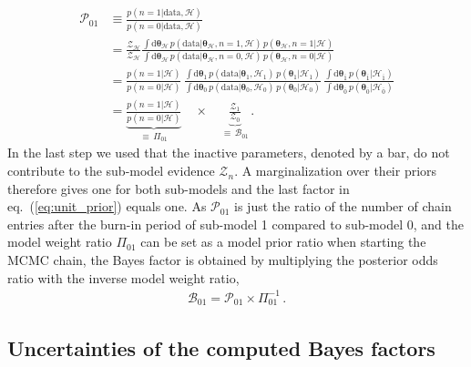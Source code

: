 	\begin{align}
		\mathcal{P}_{01} &\equiv \frac{p(n=1| \text{data}, \mathcal{H})}{p(n=0| \text{data}, \mathcal{H})} \nonumber  \\
		&= \frac{\mathcal{Z}_\mathcal{H}}{\mathcal{Z}_\mathcal{H}} \frac{\int \text{d}\bm{\theta}_\mathcal{H} \, p(\text{data} | \bm{\theta}_\mathcal{H}, n=1, \mathcal{H}) \, p(\bm{\theta}_\mathcal{H}, n=1 | \mathcal{H})}{\int \text{d}\bm{\theta}_\mathcal{H} \, p(\text{data} | \bm{\theta}_\mathcal{H}, n=0, \mathcal{H}) \, p(\bm{\theta}_\mathcal{H}, n=0 | \mathcal{H})} \nonumber  \\
		&= \frac{p(n=1 | \mathcal{H})}{p(n=0 | \mathcal{H})} \, \frac{\int \text{d}\bm{\theta}_1\, p(\text{data} | \bm{\theta}_1, \mathcal{H}_1) \, p(\bm{\theta}_1| \mathcal{H}_1)}{\int \text{d}\bm{\theta}_0 \, p(\text{data} | \bm{\theta}_0, \mathcal{H}_0) \, p(\bm{\theta}_0| \mathcal{H}_0)  } \, \frac{\int \text{d} \bm{\theta}_{\overline{1}} \, p(\bm{\theta}_{\overline{1}} | \mathcal{H}_{\overline{1}})}{\int \text{d} \bm{\theta}_{\overline{0}} \, p(\bm{\theta}_{\overline{0}} | \mathcal{H}_{\overline{0}})}  \nonumber \\
		&= \underbrace{\frac{p(n=1 | \mathcal{H})}{p(n=0 | \mathcal{H})}}_{\equiv \, \Pi_{01}} \quad \times \quad  \underbrace{\frac{\mathcal{Z}_1}{\mathcal{Z}_0}}_{\equiv \, \mathcal{B}_{01}} \, . \label{eq:unit_prior}
	\end{align}
	In the last step we used that the inactive parameters, denoted by a bar, do not contribute to the sub-model evidence $\mathcal{Z}_n$. A marginalization over their priors therefore gives one for both sub-models and the last factor in eq.~(\ref{eq:unit_prior}) equals one. As $\mathcal{P}_{01}$ is just the ratio of the number of chain entries after the burn-in period of sub-model 1 compared to sub-model 0, and the model weight ratio $\Pi_{01}$ can be set as a  model prior ratio when starting the \ac{MCMC} chain, the Bayes factor is obtained by multiplying the posterior odds ratio with the inverse model weight ratio,
	\begin{align}
		\mathcal{B}_{01} = \mathcal{P}_{01} \times \Pi_{01}^{-1}\, .\label{eq:BF_BF}
	\end{align}
	
	
	
	\subsection{Uncertainties of the computed Bayes factors}
	
